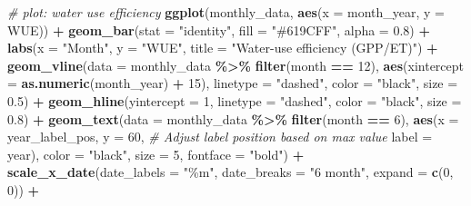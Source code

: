 \documentclass[
]{article}
\newenvironment{Shaded}{\begin{snugshade}}{\end{snugshade}}
\newcommand{\AttributeTok}[1]{\textcolor[rgb]{0.13,0.29,0.53}{#1}}
\newcommand{\CommentTok}[1]{\textcolor[rgb]{0.56,0.35,0.01}{\textit{#1}}}
\newcommand{\DecValTok}[1]{\textcolor[rgb]{0.00,0.00,0.81}{#1}}
\newcommand{\FloatTok}[1]{\textcolor[rgb]{0.00,0.00,0.81}{#1}}
\newcommand{\FunctionTok}[1]{\textcolor[rgb]{0.13,0.29,0.53}{\textbf{#1}}}
\newcommand{\NormalTok}[1]{#1}
\newcommand{\SpecialCharTok}[1]{\textcolor[rgb]{0.81,0.36,0.00}{\textbf{#1}}}
\newcommand{\StringTok}[1]{\textcolor[rgb]{0.31,0.60,0.02}{#1}}
\begin{document}
\begin{Shaded}
\begin{Highlighting}[]
\CommentTok{\# plot: water use efficiency}
\FunctionTok{ggplot}\NormalTok{(monthly\_data, }\FunctionTok{aes}\NormalTok{(}\AttributeTok{x =}\NormalTok{ month\_year, }\AttributeTok{y =}\NormalTok{ WUE)) }\SpecialCharTok{+}
  \FunctionTok{geom\_bar}\NormalTok{(}\AttributeTok{stat =} \StringTok{"identity"}\NormalTok{, }\AttributeTok{fill =} \StringTok{"\#619CFF"}\NormalTok{, }\AttributeTok{alpha =} \FloatTok{0.8}\NormalTok{) }\SpecialCharTok{+}
  \FunctionTok{labs}\NormalTok{(}\AttributeTok{x =} \StringTok{"Month"}\NormalTok{, }\AttributeTok{y =} \StringTok{"WUE"}\NormalTok{, }\AttributeTok{title =} \StringTok{"Water{-}use efficiency (GPP/ET)"}\NormalTok{) }\SpecialCharTok{+}
  \FunctionTok{geom\_vline}\NormalTok{(}\AttributeTok{data =}\NormalTok{ monthly\_data }\SpecialCharTok{\%\textgreater{}\%} \FunctionTok{filter}\NormalTok{(month }\SpecialCharTok{==} \DecValTok{12}\NormalTok{), }
             \FunctionTok{aes}\NormalTok{(}\AttributeTok{xintercept =} \FunctionTok{as.numeric}\NormalTok{(month\_year) }\SpecialCharTok{+} \DecValTok{15}\NormalTok{), }
             \AttributeTok{linetype =} \StringTok{"dashed"}\NormalTok{, }\AttributeTok{color =} \StringTok{"black"}\NormalTok{, }\AttributeTok{size =} \FloatTok{0.5}\NormalTok{) }\SpecialCharTok{+}
  \FunctionTok{geom\_hline}\NormalTok{(}\AttributeTok{yintercept =} \DecValTok{1}\NormalTok{, }\AttributeTok{linetype =} \StringTok{"dashed"}\NormalTok{, }\AttributeTok{color =} \StringTok{"black"}\NormalTok{, }\AttributeTok{size =} \FloatTok{0.8}\NormalTok{) }\SpecialCharTok{+}
  \FunctionTok{geom\_text}\NormalTok{(}\AttributeTok{data =}\NormalTok{ monthly\_data }\SpecialCharTok{\%\textgreater{}\%} \FunctionTok{filter}\NormalTok{(month }\SpecialCharTok{==} \DecValTok{6}\NormalTok{), }
            \FunctionTok{aes}\NormalTok{(}\AttributeTok{x =}\NormalTok{ year\_label\_pos, }
                \AttributeTok{y =} \DecValTok{60}\NormalTok{,  }\CommentTok{\# Adjust label position based on max value}
                \AttributeTok{label =}\NormalTok{ year), }
            \AttributeTok{color =} \StringTok{"black"}\NormalTok{, }\AttributeTok{size =} \DecValTok{5}\NormalTok{, }\AttributeTok{fontface =} \StringTok{"bold"}\NormalTok{) }\SpecialCharTok{+}
  \FunctionTok{scale\_x\_date}\NormalTok{(}\AttributeTok{date\_labels =} \StringTok{"\%m"}\NormalTok{, }\AttributeTok{date\_breaks =} \StringTok{"6 month"}\NormalTok{, }\AttributeTok{expand =} \FunctionTok{c}\NormalTok{(}\DecValTok{0}\NormalTok{, }\DecValTok{0}\NormalTok{)) }\SpecialCharTok{+}

\end{Highlighting}
\end{Shaded}
\end{document}
